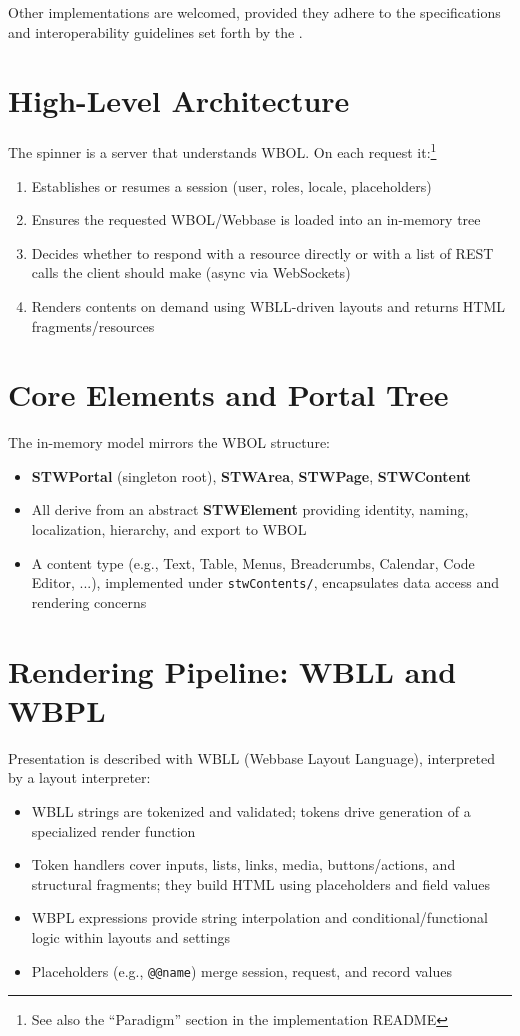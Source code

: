 Other implementations are welcomed, provided they adhere to the specifications and interoperability guidelines set forth by the \organization{}.

\section{High-Level Architecture}
The spinner is a server that understands WBOL. On each request it:\footnote{See also the ``Paradigm'' section in the implementation README}
\begin{enumerate}
	\item Establishes or resumes a session (user, roles, locale, placeholders)
	\item Ensures the requested WBOL/Webbase is loaded into an in-memory tree
	\item Decides whether to respond with a resource directly or with a list of REST calls the client should make (async via WebSockets)
	\item Renders contents on demand using WBLL-driven layouts and returns HTML fragments/resources
\end{enumerate}

\section{Core Elements and Portal Tree}
The in-memory model mirrors the WBOL structure:
\begin{itemize}
	\item \textbf{STWPortal} (singleton root), \textbf{STWArea}, \textbf{STWPage}, \textbf{STWContent}
	\item All derive from an abstract \textbf{STWElement} providing identity, naming, localization, hierarchy, and export to WBOL
	\item A content type (e.g., Text, Table, Menus, Breadcrumbs, Calendar, Code Editor, ...), implemented under \texttt{stwContents/}, encapsulates data access and rendering concerns
\end{itemize}

\section{Rendering Pipeline: WBLL and WBPL}
Presentation is described with WBLL (Webbase Layout Language), interpreted by a layout interpreter:
\begin{itemize}
	\item WBLL strings are tokenized and validated; tokens drive generation of a specialized render function
	\item Token handlers cover inputs, lists, links, media, buttons/actions, and structural fragments; they build HTML using placeholders and field values
	\item WBPL expressions provide string interpolation and conditional/functional logic within layouts and settings
	\item Placeholders (e.g., \verb|@@name|) merge session, request, and record values
\end{itemize}


